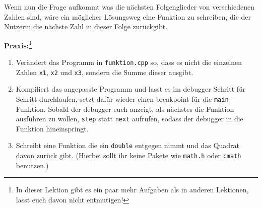 Wenn nun die Frage aufkommt was die nächsten Folgenglieder von verschiedenen Zahlen sind, wäre ein möglicher Lösungsweg eine Funktion zu schreiben, die der Nutzerin die nächste Zahl in dieser Folge zurückgibt.


\textbf{Praxis:}\footnote{In dieser Lektion gibt es ein paar mehr Aufgaben als in anderen Lektionen, lasst euch davon nicht entmutigen!}
\begin{enumerate}
	\item Verändert das Programm in \texttt{funktion.cpp} so, dass es nicht die einzelnen Zahlen \texttt{x1}, \texttt{x2} und \texttt{x3}, sondern die Summe dieser ausgibt.
	\item Kompiliert das angepasste Programm und lasst es im debugger Schritt für Schritt durchlaufen, setzt dafür wieder einen breakpoint für die \texttt{main}-Funktion.
	    Sobald der debugger euch anzeigt, als nächstes die Funktion ausführen zu wollen, \texttt{step} statt \texttt{next} aufrufen, sodass der debugger in die Funktion hineinspringt.
	\item Schreibt eine Funktion die ein \texttt{double} entgegen nimmt und das Quadrat davon zurück gibt.
	(Hierbei sollt ihr keine Pakete wie \texttt{math.h} oder \texttt{cmath} benutzen.)
\end{enumerate}


